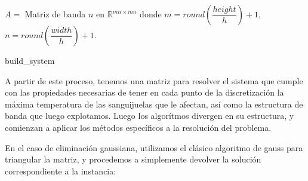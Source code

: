 \begin{algorithm}[H]
 \vspace{0.5cm}
 	$A =$ Matriz de banda $n$ en $\mathbb{R}^{mn \times mn}$ donde $m = round(\dfrac{height}{h})+1$, $n =  round(\dfrac{width}{h})+1$.
 	
 	
\caption{build\_system\label{alg_build_system}}  
\end{algorithm}

A partir de este proceso, tenemos una matriz para resolver el sistema que cumple con las propiedades necesarias de tener en cada punto de la discretización la máxima temperatura de las sanguijuelas que le afectan, así como la estructura de banda que luego explotamos. Luego los algorítmos divergen en su estructura, y comienzan a aplicar los métodos específicos a la resolución del problema.

En el caso de eliminación gaussiana, utilizamos el clásico algoritmo de gauss para triangular la matriz, y procedemos a simplemente devolver la solución correspondiente a la instancia:

